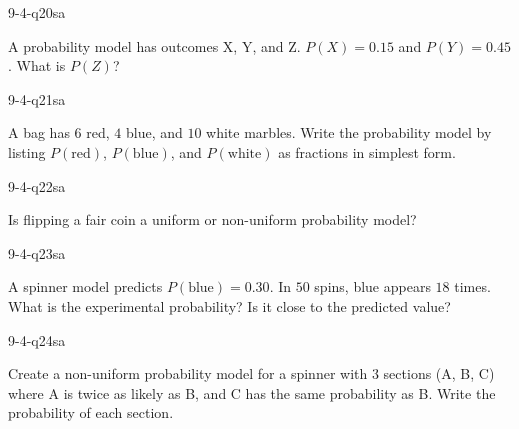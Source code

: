 \begin{practiceQuestion}{9-4-q20}{sa}
\begin{questionText}
A probability model has outcomes X, Y, and Z. $P(X) = 0.15$ and $P(Y) = 0.45$. What is $P(Z)$?
\end{questionText}
\end{practiceQuestion}

\begin{practiceQuestion}{9-4-q21}{sa}
\begin{questionText}
A bag has $6$ red, $4$ blue, and $10$ white marbles. Write the probability model by listing $P(\text{red})$, $P(\text{blue})$, and $P(\text{white})$ as fractions in simplest form.
\end{questionText}
\end{practiceQuestion}

\begin{practiceQuestion}{9-4-q22}{sa}
\begin{questionText}
Is flipping a fair coin a uniform or non-uniform probability model?
\end{questionText}
\end{practiceQuestion}

\begin{practiceQuestion}{9-4-q23}{sa}
\begin{questionText}
A spinner model predicts $P(\text{blue}) = 0.30$. In $50$ spins, blue appears $18$ times. What is the experimental probability? Is it close to the predicted value?
\end{questionText}
\end{practiceQuestion}

\begin{practiceQuestion}{9-4-q24}{sa}
\begin{questionText}
Create a non-uniform probability model for a spinner with $3$ sections (A, B, C) where A is twice as likely as B, and C has the same probability as B. Write the probability of each section.
\end{questionText}
\end{practiceQuestion}

